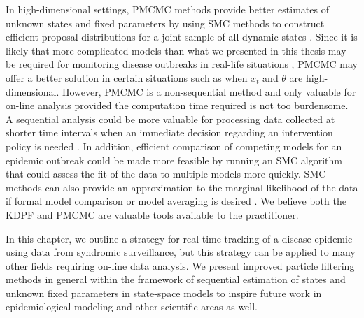 In high-dimensional settings, PMCMC methods provide better estimates of unknown states and fixed parameters by using SMC methods to construct efficient proposal distributions for a joint sample of all dynamic states \citep{Andr:Douc:Hol:pmcmc:2010}. Since it is likely that more complicated models than what we presented in this thesis may be required for monitoring disease outbreaks in real-life situations \citep{Sham:Kars:pnas:2012, Bhad:Ioni:mala:2011}, PMCMC may offer a better solution in certain situations such as when $x_t$ and $\theta$ are high-dimensional. However, PMCMC is a non-sequential method and only valuable for on-line analysis provided the computation time required is not too burdensome. A sequential analysis could be more valuable for processing data collected at shorter time intervals when an immediate decision regarding an intervention policy is needed \citep{Merl:John:Gram:Mang:stat:2008, ludkovski2010optimal, dukic2012tracking}. In addition, efficient comparison of competing models for an epidemic outbreak \citep{Bhad:Ioni:mala:2011} could be made more feasible by running an SMC algorithm that could assess the fit of the data to multiple models more quickly. SMC methods can also provide an approximation to the marginal likelihood of the data if formal model comparison or model averaging is desired \citep{douc:joh:tut:2009, zhou:joh:smcmodcomp:2013}. We believe both the KDPF and PMCMC are valuable tools available to the practitioner.

In this chapter, we outline a strategy for real time tracking of a disease epidemic using data from syndromic surveillance, but this strategy can be applied to many other fields requiring on-line data analysis. We present improved particle filtering methods in general within the framework of sequential estimation of states and unknown fixed parameters in state-space models to inspire future work in epidemiological modeling and other scientific areas as well. 